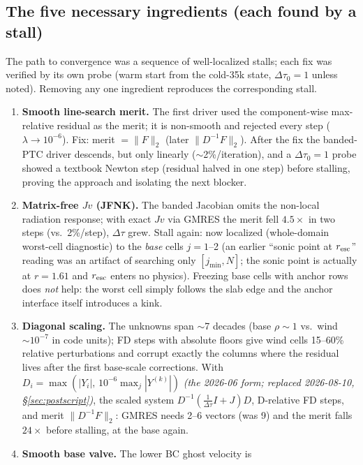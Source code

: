 \documentclass[english,a4paper]{my_memo}
\begin{document}
\subsection{The five necessary ingredients (each found by a stall)}
\label{sec:ingredients}

The path to convergence was a sequence of well-localized stalls; each fix
was verified by its own probe (warm start from the cold-35k state,
$\Delta\tau_0=1$ unless noted). Removing any one ingredient reproduces the
corresponding stall.

\begin{enumerate}
\item \textbf{Smooth line-search merit.} The first driver used the
  component-wise max-relative residual as the merit; it is non-smooth and
  rejected every step ($\lambda\to10^{-6}$). Fix: merit $=\|F\|_2$ (later
  $\|D^{-1}F\|_2$). After the fix the banded-PTC driver descends, but only
  linearly ($\sim$2\%/iteration), and a $\Delta\tau_0=1$ probe showed a
  textbook Newton step (residual halved in one step) before stalling,
  proving the approach and isolating the next blocker.
\item \textbf{Matrix-free $Jv$ (JFNK).} The banded Jacobian omits the
  non-local radiation response; with exact $Jv$ via GMRES the merit fell
  $4.5\times$ in two steps (vs.\ 2\%/step), $\Delta\tau$ grew. Stall again:
  now localized (whole-domain worst-cell diagnostic) to the
  \emph{base} cells $j=1$--2 (an earlier ``sonic point at $r_{\rm esc}$''
  reading was an artifact of searching only $[j_{\min},N]$; the sonic
  point is actually at $r=1.61$ and $r_{\rm esc}$ enters no physics).
  Freezing base cells with anchor rows does \emph{not} help: the worst
  cell simply follows the slab edge and the anchor interface itself
  introduces a kink.
\item \textbf{Diagonal scaling.} The unknowns span $\sim$7 decades (base
  $\rho\sim1$ vs.\ wind $\sim10^{-7}$ in code units); FD steps with
  absolute floors give wind cells 15--60\% relative perturbations and
  corrupt exactly the columns where the residual lives after the first
  base-scale corrections. With
  $D_i=\max(|Y_i|,\,10^{-6}\max_j|Y^{(k)}|)$ \emph{(the 2026-06 form;
  replaced 2026-08-10, \S\ref{sec:postscript})}, the scaled system
  $D^{-1}(\tfrac{1}{\Delta\tau}I+J)D$, D-relative FD steps, and merit
  $\|D^{-1}F\|_2$: GMRES needs 2--6 vectors (was 9) and the merit falls
  $24\times$ before stalling, at the base again.
\item \textbf{Smooth base valve.} The lower BC ghost velocity is

\end{enumerate}
\end{document}
